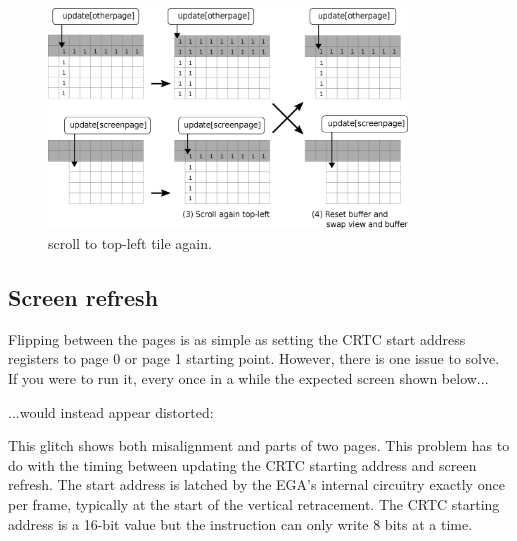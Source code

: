 \documentclass[book.tex]{subfiles}
\begin{document}
\begin{figure}[H]
  \centering
  \includegraphics[width=0.85\textwidth]{imgs/drawings/buffer_tile_move_2.eps}
  \caption{scroll to top-left tile again.}
  \label{fig:buffer_tile_move_2}
\end{figure}

\pagebreak

\subsection{Screen refresh}

Flipping between the pages is as simple as setting the CRTC start address registers to page 0 or page 1 starting point. 
However, there is one issue to solve. If you were to run it, every once in a while the expected screen shown below...

 \begin{figure}[H]
\centering
 \end{figure}
...would instead appear distorted:\\
\par
 \begin{figure}[H]
\centering
 \end{figure}
\par
This glitch shows both misalignment and parts of two pages. This problem has to do with the timing between updating the CRTC starting address and screen refresh. The start address is latched by the EGA's internal circuitry exactly once per frame, typically at the start of the vertical retracement. The CRTC starting address is a 16-bit value but the  instruction can only write 8 bits at a time. \\
\par
\end{document}

